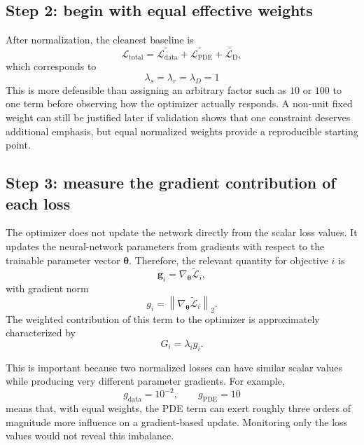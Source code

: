 \documentclass[11pt]{article}
\newcommand{\thetav}{\bm{\theta}}
\newcommand{\Ldata}{\mathcal{L}_{\mathrm{data}}}
\newcommand{\Lpde}{\mathcal{L}_{\mathrm{PDE}}}
\newcommand{\Ldir}{\mathcal{L}_{\mathrm{D}}}
\newcommand{\Ltot}{\mathcal{L}_{\mathrm{total}}}
\begin{document}
\subsection{Step 2: begin with equal effective weights}

After normalization, the cleanest baseline is
\begin{equation}
\Ltot
=\widetilde{\Ldata}
+\widetilde{\Lpde}
+\widetilde{\Ldir},
\label{eq:equal_normalized_weights}
\end{equation}
which corresponds to
\begin{equation}
\lambda_s=\lambda_r=\lambda_D=1
\end{equation}
This is more defensible than assigning an arbitrary factor such as $10$ or $100$ to one term before observing how the optimizer actually responds. A non-unit fixed weight can still be justified later if validation shows that one constraint deserves additional emphasis, but equal normalized weights provide a reproducible starting point.

\subsection{Step 3: measure the gradient contribution of each loss}

The optimizer does not update the network directly from the scalar loss values. It updates the neural-network parameters from gradients with respect to the trainable parameter vector $\thetav$. Therefore, the relevant quantity for objective $i$ is
\begin{equation}
\bm{g}_i
=\nabla_{\thetav}\widetilde{\mathcal{L}}_i,
\end{equation}
with gradient norm
\begin{equation}
g_i
=\left\|\nabla_{\thetav}\widetilde{\mathcal{L}}_i\right\|_2.
\label{eq:loss_gradient_norm}
\end{equation}
The weighted contribution of this term to the optimizer is approximately characterized by
\begin{equation}
G_i=\lambda_i g_i.
\label{eq:weighted_gradient_contribution}
\end{equation}

This is important because two normalized losses can have similar scalar values while producing very different parameter gradients. For example,
\begin{equation}
g_{\mathrm{data}}=10^{-2},\qquad
g_{\mathrm{PDE}}=10
\end{equation}
means that, with equal weights, the PDE term can exert roughly three orders of magnitude more influence on a gradient-based update. Monitoring only the loss values would not reveal this imbalance.
\end{document}
